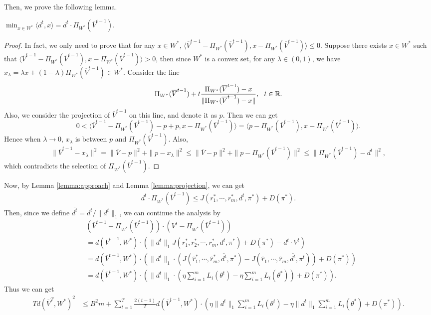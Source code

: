     Then, we prove the following lemma.
    \begin{lemma}\label{lemma:projection}
        $\min_{x\in W^*} \langle d^t, x\rangle = d^t \cdot \Pi_{W^*}(\overline{V}^{t-1}).$
    \end{lemma}
    \begin{proof}
     In fact, we only need to prove that for any $x \in W^*$, $\langle \overline{V}^{t-1}-\Pi_{W^*}(\overline{V}^{t-1}), x-\Pi_{W^*}(\overline{V}^{t-1})\rangle \le 0$. Suppose there exists $x \in W^*$ such that $\langle \overline{V}^{t-1}-\Pi_{W^*}(\overline{V}^{t-1}), x-\Pi_{W^*}(\overline{V}^{t-1})\rangle >0$, then since $W^*$ is a convex set, for any $\lambda \in (0,1)$, we have $x_\lambda = \lambda x + (1-\lambda) \Pi_{W^*}(\overline{V}^{t-1}) \in W^*$. Consider the line $$\Pi_{W^*}(\overline{V}^{t-1}) + t \frac{\Pi_{W^*}(\overline{V}^{t-1})-x}{\|\Pi_{W^*}(\overline{V}^{t-1})-x\|},\  \  t \in \mathbb{R}.$$ Also, we consider the  projection of $\overline{V}^{t-1}$ on this line, and denote it as $p$. Then we can get 
    $$0<\langle\overline{V}^{t-1}-\Pi_{W^*}(\overline{V}^{t-1})- p + p, x -\Pi_{W^*}(\overline{V}^{t-1})\rangle  = \langle p-\Pi_{W^*}(\overline{V}^{t-1}),  x -\Pi_{W^*}(\overline{V}^{t-1})\rangle. $$
    Hence when $\lambda \to 0$, $x_\lambda$ is between $p$  and $\Pi_{W^*}(\overline{V}^{t-1})$. Also, $$\|\overline{V}^{t-1}-x_\lambda \|^2 = \|\overline{V}-p\|^2 + \|p-x_\lambda\|^2 \le \|\overline{V}-p\|^2 + \|p-\Pi_{W^*}(\overline{V}^{t-1})\|^2 \le \|\Pi_{W^*}(\overline{V}^{t-1})-d^t \|^2,$$ which contradicts the selection of $\Pi_{W^*}(\overline{V}^{t-1}).$
 \end{proof}
Now, by Lemma \ref{lemma:approach} and Lemma \ref{lemma:projection}, we can get 
\begin{align*}
    d^t \cdot \Pi_{W^*}(\overline{V}^{t-1}) \le J(r_1^*, \cdots, r_m^*, d^t, \pi^*) + D(\pi^*).
\end{align*}
Then, since we define $\overline{d^t} = d^t/\|d^t\|_1$,  we can continue the analysis by
    \begin{align*}
    &(\overline{V}^{t-1}-\Pi_{W^*}(\overline{V}^{t-1}))\cdot (V^t - \Pi_{W^*}(\overline{V}^{t-1}))\\&=d(\overline{V}^{t-1}, W^*)\cdot \left( \|d^t\|_1J(r_1^*, r_2^*, \cdots, r_m^*, \overline{d^t}, \pi^*) + D(\pi^*) - d^t\cdot  V^t\right)\\
    & = d(\overline{V}^{t-1}, W^*)\cdot (\|d^t\|_1\cdot \left(J(\hat{r}_1^*, \cdots, \hat{r}_m^*, \overline{d^t}, \pi^*) - J(\hat{r}_1, \cdots, \hat{r}_m, \overline{d^t}, \pi^t)\right) + D(\pi^*))\\
    & = d(\overline{V}^{t-1}, W^*) \cdot (\|d^t\|_1\cdot (\eta \sum_{i=1}^m L_i(\theta^t) - \eta \sum_{i=1}^m L_i(\theta^*) )+ D(\pi^*)).
\end{align*}
Thus we can get 
\begin{align*}
    T d(\overline{V}^T, W^*)^2 &\le   B^2m +
    \sum_{t=1}^T \frac{2(t-1)}{T}d(\overline{V}^{t-1}, W^*) \cdot (\eta \|d^t\|_1\sum_{i=1}^m L_i(\theta^t) - \eta \|d^t\|_1\sum_{i=1}^m L_i(\theta^*) + D(\pi^*)).
\end{align*}

